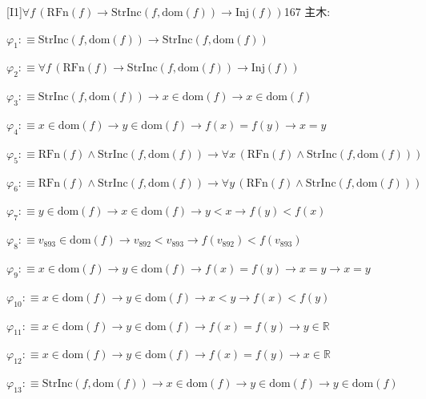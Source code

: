 \begin{fullproof}{[I1]}{$\forall f\,(\mathrm{RFn}(f) \to \mathrm{StrInc}(f,\mathrm{dom}(f)) \to \mathrm{Inj}(f))$}{167}
\noindent 主木:
\begin{ptree}
\noLine
{}
\end{ptree}
\begin{abbrevlist}
\item $\varphi_{1} :\equiv \mathrm{StrInc}(f,\mathrm{dom}(f)) \to \mathrm{StrInc}(f,\mathrm{dom}(f))$
\item $\varphi_{2} :\equiv \forall f\,(\mathrm{RFn}(f) \to \mathrm{StrInc}(f,\mathrm{dom}(f)) \to \mathrm{Inj}(f))$
\item $\varphi_{3} :\equiv \mathrm{StrInc}(f,\mathrm{dom}(f)) \to x \in \mathrm{dom}(f) \to x \in \mathrm{dom}(f)$
\item $\varphi_{4} :\equiv x \in \mathrm{dom}(f) \to y \in \mathrm{dom}(f) \to f(x) = f(y) \to x = y$
\item $\varphi_{5} :\equiv \mathrm{RFn}(f) \land \mathrm{StrInc}(f,\mathrm{dom}(f)) \to \forall x\,(\mathrm{RFn}(f) \land \mathrm{StrInc}(f,\mathrm{dom}(f)))$
\item $\varphi_{6} :\equiv \mathrm{RFn}(f) \land \mathrm{StrInc}(f,\mathrm{dom}(f)) \to \forall y\,(\mathrm{RFn}(f) \land \mathrm{StrInc}(f,\mathrm{dom}(f)))$
\item $\varphi_{7} :\equiv y \in \mathrm{dom}(f) \to x \in \mathrm{dom}(f) \to y < x \to f(y) < f(x)$
\item $\varphi_{8} :\equiv v_{893} \in \mathrm{dom}(f) \to v_{892} < v_{893} \to f(v_{892}) < f(v_{893})$
\item $\varphi_{9} :\equiv x \in \mathrm{dom}(f) \to y \in \mathrm{dom}(f) \to f(x) = f(y) \to x = y \to x = y$
\item $\varphi_{10} :\equiv x \in \mathrm{dom}(f) \to y \in \mathrm{dom}(f) \to x < y \to f(x) < f(y)$
\item $\varphi_{11} :\equiv x \in \mathrm{dom}(f) \to y \in \mathrm{dom}(f) \to f(x) = f(y) \to y \in \mathbb{R}$
\item $\varphi_{12} :\equiv x \in \mathrm{dom}(f) \to y \in \mathrm{dom}(f) \to f(x) = f(y) \to x \in \mathbb{R}$
\item $\varphi_{13} :\equiv \mathrm{StrInc}(f,\mathrm{dom}(f)) \to x \in \mathrm{dom}(f) \to y \in \mathrm{dom}(f) \to y \in \mathrm{dom}(f)$

\end{abbrevlist}
\end{fullproof}
